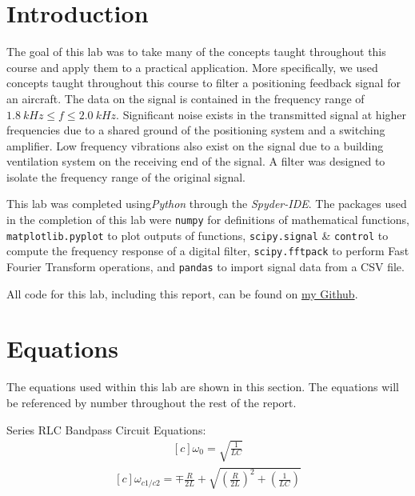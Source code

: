 \documentclass[12pt]{report}
\begin{document}
\section{Introduction}
The goal of this lab was to take many of the concepts taught throughout this course and apply them to a practical
application. More specifically, we used concepts taught throughout this course to filter a positioning feedback
signal for an aircraft. The data on the signal is contained in the frequency range of $1.8\: kHz \leq f \leq 2.0\: kHz$.
Significant noise exists in the transmitted signal at higher frequencies due to a shared ground of the positioning
system and a switching amplifier. Low frequency vibrations also exist on the signal due to a building ventilation
system on the receiving end of the signal. A filter was designed to isolate the frequency range of the original signal.

This lab was completed using\textit{Python} through the \textit{Spyder-IDE}. The packages used in the completion 
of this lab were \texttt{numpy} for definitions of mathematical functions, \texttt{matplotlib.pyplot} to plot outputs 
of functions, \texttt{scipy.signal} \& \texttt{control} to compute the frequency response of a digital filter, 
\texttt{scipy.fftpack} to perform Fast Fourier Transform operations, and \texttt{pandas} to import signal data
from a CSV file.

All code for this lab, including this report, can be found on \href{http://github.com/mac-edmondson}{my Github}.
\section{Equations}\label{section: eq}
The equations used within this lab are shown in this section. The equations will be referenced by number throughout
the rest of the report.

Series RLC Bandpass Circuit Equations:
\begin{equation}\label{eq: cen_freq} %
  \begin{aligned}[c]
    \omega_0 = \sqrt{\frac{1}{LC}}
  \end{aligned}
\end{equation}
\begin{equation}\label{eq: cor_freq} %
  \begin{aligned}[c]
    \omega_{c1/c2} = \mp \frac{R}{2L} + \sqrt{(\frac{R}{2L})^2 + (\frac{1}{LC})}
  \end{aligned}
\end{equation}
\end{document}
